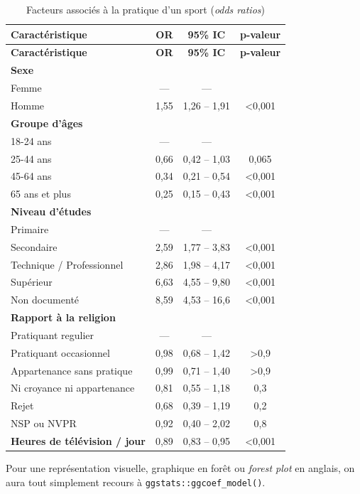 \documentclass[
  letterpaper,
  DIV=11,
  numbers=noendperiod,
  oneside]{scrreprt}
\begin{document}
\hypertarget{tbl-regression-logistique-OR}{}
\begin{longtable}[]{@{}lccc@{}}
\caption{\label{tbl-regression-logistique-OR}Facteurs associés à la
pratique d'un sport (\emph{odds ratios})}\tabularnewline
\toprule()
\textbf{Caractéristique} & \textbf{OR} & \textbf{95\% IC} &
\textbf{p-valeur} \\
\midrule()
\endfirsthead
\toprule()
\textbf{Caractéristique} & \textbf{OR} & \textbf{95\% IC} &
\textbf{p-valeur} \\
\midrule()
\endhead
\textbf{Sexe} & & & \\
Femme & --- & --- & \\
Homme & 1,55 & 1,26 -- 1,91 & \textless0,001 \\
\textbf{Groupe d'âges} & & & \\
18-24 ans & --- & --- & \\
25-44 ans & 0,66 & 0,42 -- 1,03 & 0,065 \\
45-64 ans & 0,34 & 0,21 -- 0,54 & \textless0,001 \\
65 ans et plus & 0,25 & 0,15 -- 0,43 & \textless0,001 \\
\textbf{Niveau d'études} & & & \\
Primaire & --- & --- & \\
Secondaire & 2,59 & 1,77 -- 3,83 & \textless0,001 \\
Technique / Professionnel & 2,86 & 1,98 -- 4,17 & \textless0,001 \\
Supérieur & 6,63 & 4,55 -- 9,80 & \textless0,001 \\
Non documenté & 8,59 & 4,53 -- 16,6 & \textless0,001 \\
\textbf{Rapport à la religion} & & & \\
Pratiquant regulier & --- & --- & \\
Pratiquant occasionnel & 0,98 & 0,68 -- 1,42 & \textgreater0,9 \\
Appartenance sans pratique & 0,99 & 0,71 -- 1,40 & \textgreater0,9 \\
Ni croyance ni appartenance & 0,81 & 0,55 -- 1,18 & 0,3 \\
Rejet & 0,68 & 0,39 -- 1,19 & 0,2 \\
NSP ou NVPR & 0,92 & 0,40 -- 2,02 & 0,8 \\
\textbf{Heures de télévision / jour} & 0,89 & 0,83 -- 0,95 &
\textless0,001 \\
\bottomrule()
\end{longtable}

Pour une représentation visuelle, graphique en forêt ou \emph{forest
plot} en anglais, on aura tout simplement recours à
\texttt{ggstats::ggcoef\_model()}.
\end{document}
